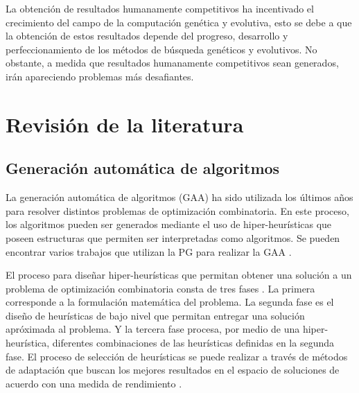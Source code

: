 La obtención de resultados humanamente competitivos ha incentivado el crecimiento del campo de la computación genética y evolutiva, esto se debe a que la obtención de estos resultados depende del progreso, desarrollo y perfeccionamiento de los métodos de búsqueda genéticos y evolutivos. No obstante, a medida que resultados humanamente competitivos sean generados, irán apareciendo problemas más desafiantes.

\section{Revisión de la literatura}
\label{cap:rev_literatura}

\subsection{Generación automática de algoritmos}
La generación automática de algoritmos (GAA) ha sido utilizada los últimos años para resolver distintos problemas de optimización combinatoria. En este proceso, los algoritmos pueden ser generados mediante el uso de hiper-heurísticas que poseen estructuras que permiten ser interpretadas como algoritmos. Se pueden encontrar varios trabajos que utilizan la PG para realizar la GAA \citep{contreras_2013, drake_2014, parada_2015}.

El proceso para diseñar hiper-heurísticas que permitan obtener una solución a un problema de optimización combinatoria consta de tres fases \citep{alinia_2012}. La primera corresponde a la formulación matemática del problema. La segunda fase es el diseño de heurísticas de bajo nivel que permitan entregar una solución apróximada al problema. Y la tercera fase procesa, por medio de una hiper-heurística, diferentes combinaciones de las heurísticas definidas en la segunda fase. El proceso de selección de heurísticas se puede realizar a través de métodos de adaptación que buscan los mejores resultados en el espacio de soluciones de acuerdo con una medida de rendimiento \citep{parada_2015}.



